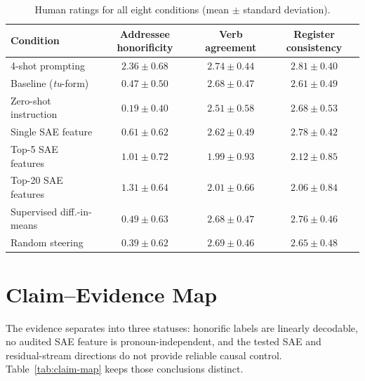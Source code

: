 \documentclass[10pt]{article}
\newcommand{\tu}{\textit{tu}}
\begin{document}
\begin{table}[H]
\centering
\small
\setlength\tabcolsep{8pt}
\begin{tabular}{lccc}
\toprule
\textbf{Condition} & \textbf{Addressee honorificity} & \textbf{Verb agreement} & \textbf{Register consistency} \\
\midrule
4-shot prompting & $2.36\pm0.68$ & $2.74\pm0.44$ & $2.81\pm0.40$ \\
Baseline (\tu-form) & $0.47\pm0.50$ & $2.68\pm0.47$ & $2.61\pm0.49$ \\
Zero-shot instruction & $0.19\pm0.40$ & $2.51\pm0.58$ & $2.68\pm0.53$ \\
Single SAE feature & $0.61\pm0.62$ & $2.62\pm0.49$ & $2.78\pm0.42$ \\
Top-5 SAE features & $1.01\pm0.72$ & $1.99\pm0.93$ & $2.12\pm0.85$ \\
Top-20 SAE features & $1.31\pm0.64$ & $2.01\pm0.66$ & $2.06\pm0.84$ \\
Supervised diff.-in-means & $0.49\pm0.63$ & $2.68\pm0.47$ & $2.76\pm0.46$ \\
Random steering & $0.39\pm0.62$ & $2.69\pm0.46$ & $2.65\pm0.48$ \\
\bottomrule
\end{tabular}
\caption{Human ratings for all eight conditions (mean $\pm$ standard deviation).}
\label{tab:human}
\end{table}
\FloatBarrier

\iffalse
\section{Claim--Evidence Map}

The evidence separates into three statuses: honorific labels are linearly
decodable, no audited SAE feature is pronoun-independent, and the tested SAE
and residual-stream directions do not provide reliable causal control.
Table~\ref{tab:claim-map} keeps those conclusions distinct.
\end{document}
